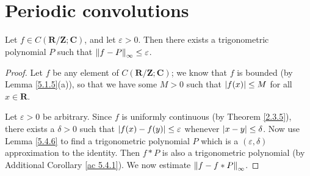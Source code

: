 \section{Periodic convolutions}\label{sec 5.4}

\begin{theorem}\label{5.4.1}
    Let \(f \in C(\mathbf{R} / \mathbf{Z} ; \mathbf{C})\), and let \(\varepsilon > 0\).
    Then there exists a trigonometric polynomial \(P\) such that \(\norm*{f - P}_{\infty} \leq \varepsilon\).
\end{theorem}

\begin{proof}
    Let \(f\) be any element of \(C(\mathbf{R} / \mathbf{Z} ; \mathbf{C})\);
    we know that \(f\) is bounded (by Lemma \ref{5.1.5}(a)), so that we have some \(M > 0\) such that \(\abs*{f(x)} \leq M\) for all \(x \in \mathbf{R}\).

    Let \(\varepsilon > 0\) be arbitrary.
    Since \(f\) is uniformly continuous (by Theorem \ref{2.3.5}), there exists a \(\delta > 0\) such that \(\abs*{f(x) - f(y)} \leq \varepsilon\) whenever \(\abs*{x - y} \leq \delta\).
    Now use Lemma \ref{5.4.6} to find a trigonometric polynomial \(P\) which is a \((\varepsilon, \delta)\) approximation to the identity.
    Then \(f * P\) is also a trigonometric polynomial (by Additional Corollary \ref{ac 5.4.1}).
    We now estimate \(\norm*{f - f * P}_{\infty}\).


\end{proof}
